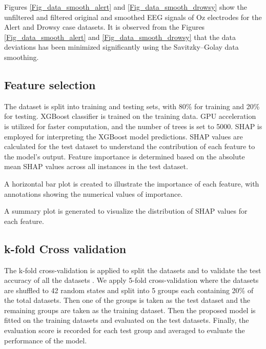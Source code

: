 \documentclass{IEEE_lsens}
\begin{document}
Figures \ref{Fig_data_smooth_alert} and \ref{Fig_data_smooth_drowsy} show the unfiltered and filtered original and smoothed EEG signals of Oz electrodes for the Alert and Drowsy case datasets. It is observed from the Figures \ref{Fig_data_smooth_alert} and \ref{Fig_data_smooth_drowsy} that the data deviations has been minimized significantly using the Savitzky–Golay data smoothing.
\subsection{Feature selection} 
The dataset is split into training and testing sets, with 80\% for training and 20\% for testing. XGBoost classifier is trained on the training data. GPU acceleration is utilized for faster computation, and the number of trees is set to 5000. SHAP is employed for interpreting the XGBoost model predictions. SHAP values are calculated for the test dataset to understand the contribution of each feature to the model's output. Feature importance is determined based on the absolute mean SHAP values across all instances in the test dataset.

A horizontal bar plot is created to illustrate the importance of each feature, with annotations showing the numerical values of importance.

A summary plot is generated to visualize the distribution of SHAP values for each feature.
\subsection{k-fold Cross validation}
\vspace{-0.15cm}
The k-fold cross-validation is applied to split the datasets and to validate the test accuracy of all the datasets \cite{175}. We apply 5-fold cross-validation where the datasets are shuffled to 42 random states and split into 5 groups each containing 20\% of the total datasets. Then one of the groups is taken as the test dataset and the remaining groups are taken as the training dataset. Then the proposed model is fitted on the training datasets and evaluated on the test datasets. Finally, the evaluation score is recorded for each test group and averaged to evaluate the performance of the model.
\vspace{-0.3cm}
\end{document}
